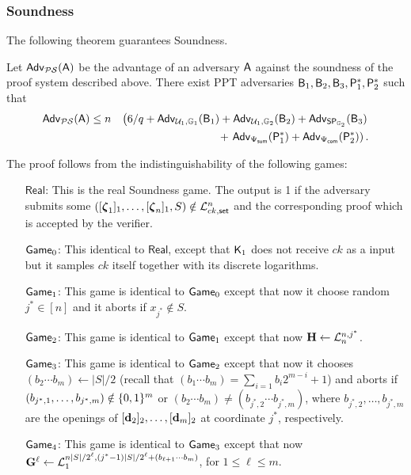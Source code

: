 \subsubsection{Soundness}

The following theorem guarantees Soundness. 
 
\begin{theorem} Let $\mathsf{Adv}_{\mathcal{PS}}(\mathsf{A})$ 
be the advantage of an adversary $\mathsf{A}$ against the soundness of 
the proof system  described above. There exist PPT adversaries
$\mathsf{B}_1,\mathsf{B}_2,\mathsf{B}_3,\mathsf{P}^*_1,\mathsf{P}^*_2$ such that 
\begin{eqnarray*}
\mathsf{Adv}_{\mathcal{PS}}(\mathsf{A}) & \leq 
n& \left(6/q+ \mathsf{Adv}_{\mathcal{U}_1,\mathbb{G}_1}(\mathsf{B}_1)
+  \mathsf{Adv}_{\mathcal{U}_1,\mathbb{G}_2}(\mathsf{B}_2)
+  \mathsf{Adv}_{\mathsf{SP}_{\mathbb{G}_2}}(\mathsf{B}_3)\right. \\
& & \mbox{ } 
+  \left.\mathsf{Adv}_{{\Psi_{\mathsf{sum}}}}(\mathsf{P}^*_1)
+
 \mathsf{Adv}_{{\Psi_{\mathsf{com}}}}(\mathsf{P}^*_2)\right).
\end{eqnarray*}
\label{teo:bitstr-soundness}
\end{theorem}

The proof follows from the indistinguishability of the following games:
\begin{itemize}
\item[$\mathsf{Real}$:] This is the real Soundness game. The output is 1 if the adversary submits some $([{\boldsymbol \zeta}_1]_1,\ldots,[{\boldsymbol \zeta}_n]_1,S)\notin\mathcal{L}_{ck,\mathsf{set}}^n$ and the corresponding proof which is accepted by the verifier.
\item[$\mathsf{Game}_0$:] This identical to $\mathsf{Real}$, except that $\mathsf{K}_1$ does not receive $ck$ as a input but
it samples $ck$ itself together with its discrete logarithms.
\item[$\mathsf{Game}_1$:] This game is identical to $\mathsf{Game}_0$ except that now it choose random $j^*\in[n]$ and it aborts if $x_{j^*}\notin S$.
\item[$\mathsf{Game}_2$:] This game is identical to $\mathsf{Game}_1$ except that now $\mathbf{{H}}\gets\mathcal{L}^{n,j^*}_n$.
\item[$\mathsf{Game}_3$:] This game is identical to $\mathsf{Game}_2$ except that now it chooses $(b_2\cdots b_m)\gets |S|/2$ (recall that $(b_1\cdots b_m)=\sum_{i=1}b_i2^{m-i}+1$) and aborts if $(b_{j^*,1},\ldots,b_{j^*,m})\notin\{0,1\}^m$ or $(b_2\cdots b_m)\neq(b_{j^*,2}\cdots b_{j^*,m})$, where $b_{j^*,2},\ldots,b_{j^*,m}$ are the openings of $[\mathbf{d}_2]_2,\ldots,[\mathbf{d}_m]_2$ at coordinate $j^*$, respectively.
\item[$\mathsf{Game}_4$:] This game is identical to $\mathsf{Game}_3$ except that now $\mathbf{{G}}^\ell\gets\mathcal{L}_1^{n|S|/2^\ell,(j^*-1)|S|/2^\ell+(b_{\ell+1}\cdots b_m)}$, for $1\leq\ell\leq m$.
\end{itemize}

